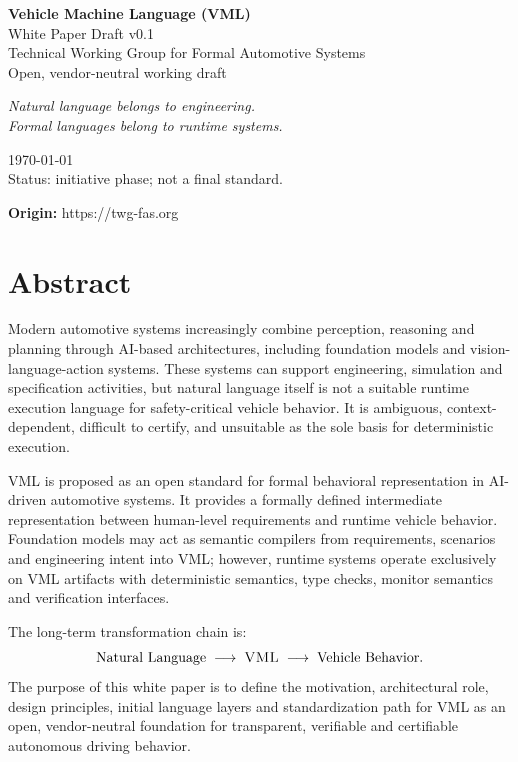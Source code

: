 \documentclass[11pt,a4paper]{article}
\newcommand{\VML}{\textsc{VML}}
\newcommand{\IR}{intermediate representation}
\begin{document}
\begin{titlepage}
  \centering
  \vspace*{24mm}
  {\Huge\bfseries Vehicle Machine Language (\VML)\\[3mm]}
  {\Large White Paper Draft v0.1\\[12mm]}
  {\large Technical Working Group for Formal Automotive Systems\\[4mm]}
  {\large Open, vendor-neutral working draft\\[20mm]}
  \begin{minipage}{0.78\textwidth}
    \centering
    \itshape
    Natural language belongs to engineering.\\
    Formal languages belong to runtime systems.
  \end{minipage}
  \vfill
  {\large \today\\[2mm]}
  {\small Status: initiative phase; not a final standard.}
\end{titlepage}

\begin{center}
\textbf{Origin:} https://twg-fas.org
\end{center}

\tableofcontents
\newpage

\section*{Abstract}
Modern automotive systems increasingly combine perception, reasoning and planning through AI-based architectures, including foundation models and vision-language-action systems. These systems can support engineering, simulation and specification activities, but natural language itself is not a suitable runtime execution language for safety-critical vehicle behavior. It is ambiguous, context-dependent, difficult to certify, and unsuitable as the sole basis for deterministic execution.

\VML{} is proposed as an open standard for formal behavioral representation in AI-driven automotive systems. It provides a formally defined \IR{} between human-level requirements and runtime vehicle behavior. Foundation models may act as semantic compilers from requirements, scenarios and engineering intent into \VML; however, runtime systems operate exclusively on \VML{} artifacts with deterministic semantics, type checks, monitor semantics and verification interfaces.

The long-term transformation chain is:
\[
  \text{Natural Language} \;\longrightarrow\; \VML{} \;\longrightarrow\; \text{Vehicle Behavior}.
\]
The purpose of this white paper is to define the motivation, architectural role, design principles, initial language layers and standardization path for \VML{} as an open, vendor-neutral foundation for transparent, verifiable and certifiable autonomous driving behavior.
\end{document}
